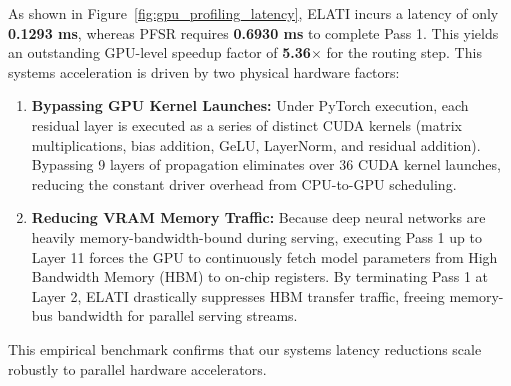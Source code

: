 As shown in Figure~\ref{fig:gpu_profiling_latency}, ELATI incurs a latency of only \textbf{0.1293 ms}, whereas PFSR requires \textbf{0.6930 ms} to complete Pass 1.
This yields an outstanding GPU-level speedup factor of \textbf{5.36$\times$} for the routing step.
This systems acceleration is driven by two physical hardware factors:
\begin{enumerate}
    \item \textbf{Bypassing GPU Kernel Launches:} Under PyTorch execution, each residual layer is executed as a series of distinct CUDA kernels (matrix multiplications, bias addition, GeLU, LayerNorm, and residual addition). Bypassing 9 layers of propagation eliminates over 36 CUDA kernel launches, reducing the constant driver overhead from CPU-to-GPU scheduling.
    \item \textbf{Reducing VRAM Memory Traffic:} Because deep neural networks are heavily memory-bandwidth-bound during serving, executing Pass 1 up to Layer 11 forces the GPU to continuously fetch model parameters from High Bandwidth Memory (HBM) to on-chip registers. By terminating Pass 1 at Layer 2, ELATI drastically suppresses HBM transfer traffic, freeing memory-bus bandwidth for parallel serving streams.
\end{enumerate}
This empirical benchmark confirms that our systems latency reductions scale robustly to parallel hardware accelerators.

